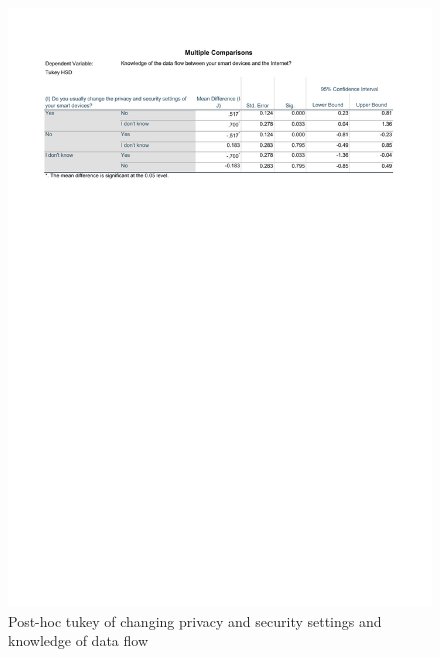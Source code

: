 \begin{figure}[!h]
    \centering
    \includegraphics[scale=0.7]{figures/tables/anova_changesettings_dataflow_tukey.pdf}
    \caption{Post-hoc tukey of changing privacy and security settings and knowledge of data flow}
    \label{fig:anova_changesettings_dataflow_tukey}
\end{figure}

